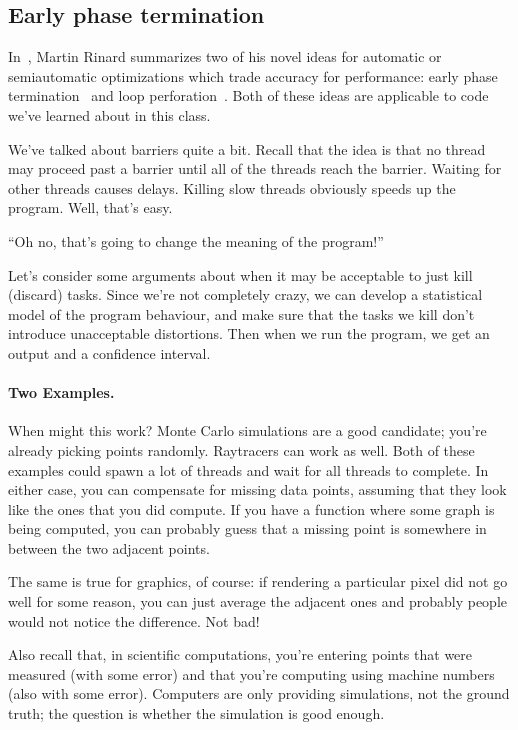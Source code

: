 \subsection*{Early phase termination}

In~\cite{Rinard:2010:PSA:1932682.1869525}, Martin Rinard summarizes
two of his novel ideas for automatic or semiautomatic optimizations
which trade accuracy for performance: early phase
termination~\cite{Rinard:2007:EarlyPhaseTermination} and loop
perforation~\cite{hoffmann09:_using_code_perfor_improv_perfor}. Both
of these ideas are applicable to code we've learned about in this
class.


We've talked about barriers quite a bit. Recall that the idea is that
no thread may proceed past a barrier until all of the threads
reach the barrier. Waiting for other threads causes delays. 
Killing slow threads obviously speeds up the program. Well, that's easy.

\begin{center}
``Oh no, that's going to change the meaning of the program!''
\end{center}

Let's consider some arguments about when it may be acceptable to just
kill (discard) tasks. Since we're not completely crazy, we can develop
a statistical model of the program behaviour, and make sure that the
tasks we kill don't introduce unacceptable distortions. Then when we
run the program, we get an output and a confidence interval.

\paragraph{Two Examples.} When might this work? Monte Carlo simulations
are a good candidate; you're already picking points randomly.
Raytracers can work as well. Both of these examples could spawn a lot
of threads and wait for all threads to complete.  In either case, you
can compensate for missing data points, assuming that they look like
the ones that you did compute. If you have a function where some graph is being
computed, you can probably guess that a missing point is somewhere in between
the two adjacent points.

The same is true for graphics, of course: if rendering a particular pixel did
not go well for some reason, you can just average the adjacent ones and probably
people would not notice the difference. Not bad!

Also recall that, in scientific computations, you're entering points
that were measured (with some error) and that you're computing
using machine numbers (also with some error). Computers are only
providing simulations, not the ground truth; the question is
whether the simulation is good enough.

